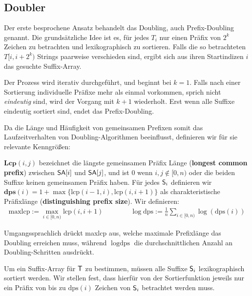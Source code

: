 \subsection{Doubler}
\label{sec:ansatz:doubler}
Der  erste besprochene Ansatz behandelt das Doubling, auch Prefix-Doubling genannt.
Die grundsätzliche Idee ist es, für jedes $T_i$ nur einen Präfix von $2^k$ Zeichen zu betrachten und lexikographisch zu sortieren. Falls die so betrachteten $T[i, i + 2^k)$ Strings paarweise verschieden sind, ergibt sich aus ihren Startindizen $i$ das gesuchte Suffix-Array. 

Der Prozess wird iterativ durchgeführt, und beginnt bei $k = 1$. Falls nach einer Sortierung individuelle Präfixe mehr als einmal vorkommen, sprich nicht \textit{eindeutig} sind, wird der Vorgang mit $k + 1$ wiederholt. Erst wenn alle Suffixe eindeutig sortiert sind, endet das Prefix-Doubling.

Da die Länge und Häufigkeit von gemeinsamen Prefixen somit das Laufzeitverhalten von Doubling-Algorithmen beeinflusst, definieren wir für sie relevante Kenngrößen:

$\textbf{Lcp}(i, j)$ bezeichnet die längste gemeinsamen Präfix Länge (\textbf{longest common prefix}) zwischen $\sa[i]$ und $\sa[j]$, und ist $0$ wenn $i, j \notin [0, n)$ oder die beiden Suffixe keinen gemeinsamen Präfix haben. Für jedes $\mathsf{S}_{i}$ definieren wir $\textbf{dps}(i) = 1 + \max\{\text{lcp}(i - 1, i), \text{lcp}(i, i + 1)\}$ als charakteristische Präfixlänge (\textbf{distinguishing prefix size}). Wir definieren:
\begin{gather*}
\text{maxlcp} := \max_{i \in [0, n)} \text{lcp}(i, i + 1) 
\qquad\qquad
\log \text{dps} := \frac{1}{n} \sum_{i \in [0, n)} \log(\text{dps}(i))
\end{gather*}

Umgangssprachlich drückt maxlcp aus, welche maximale Prefixlänge das Doubling erreichen muss, während $\log \text{dps}$ die durchschnittlichen Anzahl an Doubling-Schritten ausdrückt.

Um ein Suffix-Array für $\inputtext$ zu bestimmen, müssen alle Suffixe $\mathsf{S}_{i}$ lexikographisch sortiert werden. Wir stellen fest, dass hierfür von der Sortierfunktion jeweils nur ein Präfix von bis zu $\text{dps}(i)$ Zeichen von $\mathsf{S}_{i}$ betrachtet werden muss.
